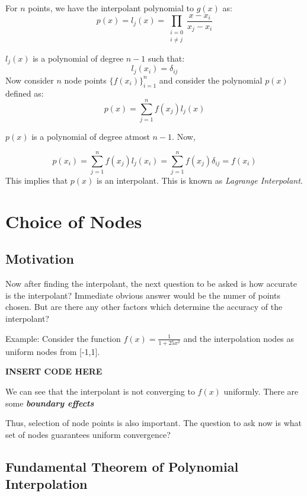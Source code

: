 \documentclass[
]{book}
\begin{document}
For \(n\) points, we have the interpolant polynomial to \(g(x)\) as:
\begin{equation}
p(x) = l_j(x) = \prod_{\substack{i=0 \\ i\neq j}} \frac{x-x_i}{x_j-x_i}
\end{equation}

\(l_j(x)\) is a polynomial of degree \(n-1\) such that:
\[l_j(x_i) = \delta_{ij}\]
Now consider \(n\) node points \(\{f(x_i)\}_{i=1}^n\) and consider the polynomial \(p(x)\) defined as:
\begin{equation}
p(x) = \sum_{j=1}^n f(x_j) l_j(x)
\end{equation}

\(p(x)\) is a polynomial of degree atmost \(n-1\). Now,

\[p(x_i) = \sum_{j=1}^n f(x_j) l_j(x_i) = \sum_{j=1}^n f(x_j) \delta_{ij} = f(x_i)\]
This implies that \(p(x)\) is an interpolant. This is known as \emph{Lagrange Interpolant}.

\hypertarget{choice-of-nodes}{%
\section{Choice of Nodes}\label{choice-of-nodes}}

\hypertarget{motivation-1}{%
\subsection{Motivation}\label{motivation-1}}

Now after finding the interpolant, the next question to be asked is how accurate is the interpolant? Immediate obvious answer would be the numer of points chosen. But are there any other factors which determine the accuracy of the interpolant?

Example: Consider the function \(f(x) = \frac{1}{1+25x^2}\) and the interpolation nodes as uniform nodes from {[}-1,1{]}.

\textbf{INSERT CODE HERE}

We can see that the interpolant is not converging to \(f(x)\) uniformly. There are some \textbf{\emph{boundary effects}}

Thus, selection of node points is also important. The question to ask now is what set of nodes guarantees uniform convergence?

\hypertarget{fundamental-theorem-of-polynomial-interpolation}{%
\subsection{Fundamental Theorem of Polynomial Interpolation}\label{fundamental-theorem-of-polynomial-interpolation}}
\end{document}
